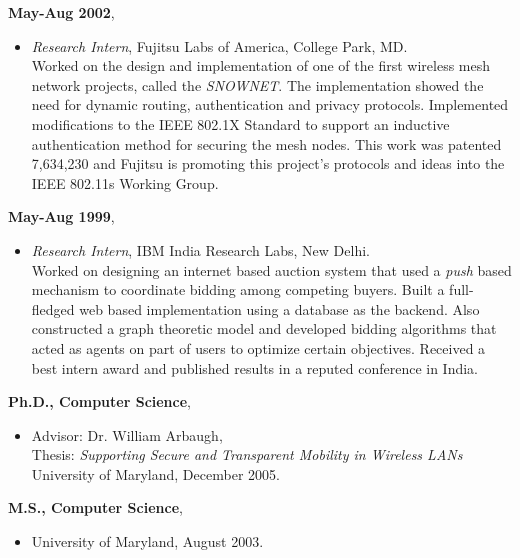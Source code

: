\begin{resume}
\begin{itemize}
   \end{itemize}

 {\bf May-Aug 2002},   	
    \begin{itemize}
         \item[] {\it Research Intern}, Fujitsu Labs of America, College Park, MD.\\
		Worked on the design and implementation of one of the first wireless mesh network projects, called the {\em SNOWNET}.
	        The implementation showed the need for dynamic routing, authentication and privacy protocols. Implemented modifications to the IEEE 802.1X Standard
                to support an inductive authentication method for securing the mesh nodes. This work was patented 7,634,230 and Fujitsu is promoting this project's
                protocols and ideas into the IEEE 802.11s Working Group.
		
    \end{itemize}

 {\bf May-Aug 1999},   	
    \begin{itemize}
         \item[] {\it Research Intern},  IBM India Research Labs, New Delhi.\\
		Worked on designing an internet based auction system that used a {\em push} based mechanism to
                coordinate bidding among competing buyers. Built a full-fledged web based implementation using a database as the
                backend. Also constructed a graph theoretic model and developed bidding algorithms that
                acted as agents on part of users to optimize certain
		objectives. Received a best intern award and published results
		in a reputed conference in India.
    \end{itemize}

{\bf Ph.D., Computer Science},
    \begin{itemize}
         \item[] Advisor: Dr. William Arbaugh, \\
		 Thesis: {\em Supporting Secure and Transparent Mobility in Wireless LANs} \\
                 University of Maryland, December 2005.
    \end{itemize}

{\bf M.S., Computer Science},   	
    \begin{itemize}
         \item[] University of Maryland, August 2003.
    \end{itemize}


\end{resume}
